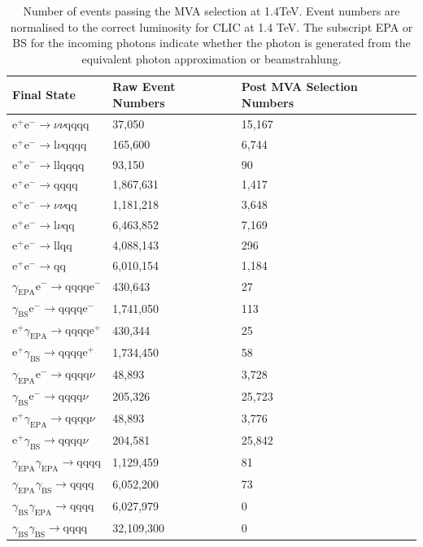 \begin{table}[h!]
\centering
\begin{tabular}{ l l l}
\hline
Final State & Raw Event Numbers & Post MVA Selection Numbers \\ 
\hline
$\text{e}^{+}\text{e}^{-} \rightarrow \nu{\nu}\text{qqqq}$ & 37,050 & 15,167 \\
$\text{e}^{+}\text{e}^{-} \rightarrow \text{l}\nu\text{qqqq}$ & 165,600 & 6,744 \\
$\text{e}^{+}\text{e}^{-} \rightarrow \text{llqqqq}$ & 93,150 & 90 \\
$\text{e}^{+}\text{e}^{-} \rightarrow \text{qqqq}$ & 1,867,631 & 1,417 \\
$\text{e}^{+}\text{e}^{-} \rightarrow \nu{\nu}\text{qq}$ & 1,181,218 & 3,648 \\
$\text{e}^{+}\text{e}^{-} \rightarrow \text{l}\nu\text{qq}$ & 6,463,852 & 7,169 \\
$\text{e}^{+}\text{e}^{-} \rightarrow \text{llqq}$ & 4,088,143 & 296 \\
$\text{e}^{+}\text{e}^{-} \rightarrow \text{qq}$ & 6,010,154 & 1,184 \\
$\gamma_{\text{EPA}}\text{e}^{-} \rightarrow \text{qqqq}\text{e}^{-}$ & 430,643 & 27 \\
$\gamma_{\text{BS}}\text{e}^{-} \rightarrow \text{qqqq}\text{e}^{-}$ & 1,741,050 & 113 \\
$\text{e}^{+}\gamma_{\text{EPA}} \rightarrow \text{qqqq}\text{e}^{+}$ & 430,344 & 25 \\
$\text{e}^{+}\gamma_{\text{BS}} \rightarrow \text{qqqq}\text{e}^{+}$ & 1,734,450 & 58 \\
$\gamma_{\text{EPA}}\text{e}^{-} \rightarrow \text{qqqq}\nu$ & 48,893 & 3,728 \\
$\gamma_{\text{BS}}\text{e}^{-} \rightarrow \text{qqqq}\nu$ & 205,326 & 25,723 \\
$\text{e}^{+}\gamma_{\text{EPA}} \rightarrow \text{qqqq}\nu$ & 48,893 & 3,776 \\
$\text{e}^{+}\gamma_{\text{BS}} \rightarrow \text{qqqq}\nu$ & 204,581 & 25,842 \\
$\gamma_{\text{EPA}}\gamma_{\text{EPA}} \rightarrow \text{qqqq}$ & 1,129,459 & 81 \\
$\gamma_{\text{EPA}}\gamma_{\text{BS}} \rightarrow \text{qqqq}$ & 6,052,200 & 73 \\
$\gamma_{\text{BS}}\gamma_{\text{EPA}} \rightarrow \text{qqqq}$ & 6,027,979 & 0 \\
$\gamma_{\text{BS}}\gamma_{\text{BS}} \rightarrow \text{qqqq}$ & 32,109,300 & 0 \\
\hline
\end{tabular}
\caption[Number of events passing the MVA selection at 1.4TeV.]{Number of events passing the MVA selection at 1.4TeV.  Event numbers are normalised to the correct luminosity for CLIC at 1.4 TeV.   The subscript EPA or BS for the incoming photons indicate whether the photon is generated from the equivalent photon approximation or beamstrahlung.}
\label{table:postmvanumbers1400GeV}
\end{table}

